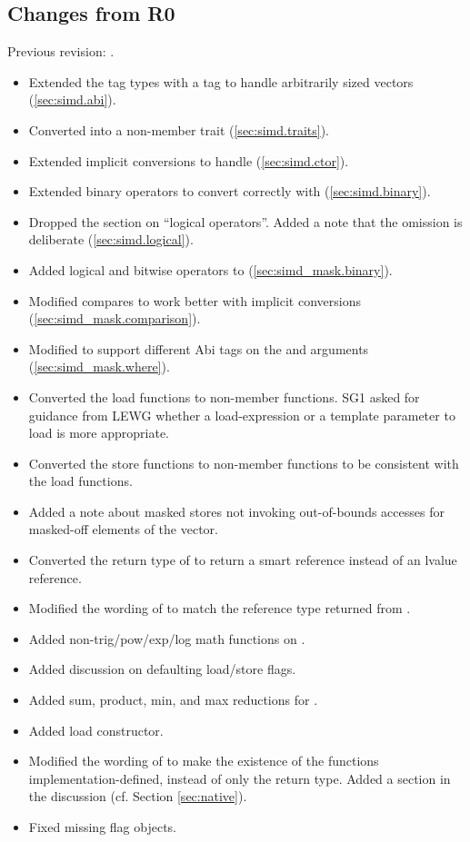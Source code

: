 \subsection{Changes from R0}
Previous revision: \parencite{P0214R0}.
\begin{itemize}
  \item Extended the  tag types with a  tag to handle arbitrarily sized vectors (\ref{sec:simd.abi}).
  \item Converted  into a non-member trait (\ref{sec:simd.traits}).
  \item Extended implicit conversions to handle \fixedsizeN (\ref{sec:simd.ctor}).
  \item Extended binary operators to convert correctly with \fixedsizeN (\ref{sec:simd.binary}).
  \item Dropped the section on “\simd logical operators”. Added a note that the omission is deliberate (\ref{sec:simd.logical}).
  \item Added logical and bitwise operators to \mask (\ref{sec:simd_mask.binary}).
  \item Modified \mask compares to work better with implicit conversions (\ref{sec:simd_mask.comparison}).
  \item Modified  to support different Abi tags on the \mask and \simd arguments (\ref{sec:simd_mask.where}).
  \item Converted the load functions to non-member functions.
    SG1 asked for guidance from LEWG whether a load-expression or a template parameter to load is more appropriate.
  \item Converted the store functions to non-member functions to be consistent with the load functions.
  \item Added a note about masked stores not invoking out-of-bounds accesses for masked-off elements of the vector.
  \item Converted the return type of \simd{} to return a smart reference instead of an lvalue reference.
  \item Modified the wording of \mask{} to match the reference type returned from \simd{}.
  \item Added non-trig/pow/exp/log math functions on \simd.
  \item Added discussion on defaulting load/store flags.
  \item Added sum, product, min, and max reductions for \simd.
  \item Added load constructor.
  \item Modified the wording of  to make the existence of the functions implementation-defined, instead of only the return type.
    Added a section in the discussion (cf. Section \ref{sec:native}).
  \item Fixed missing flag objects.
\end{itemize}








